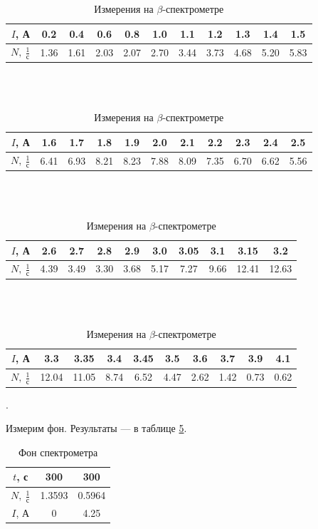 \documentclass[a4paper, 12pt]{article}
\newcounter{Points}
\newcommand{\point}{\arabic{Points}. \addtocounter{Points}{1}}
\begin{document}
\begin{table}[!h]
    \centering
    \begin{tabular}{|c|c|c|c|c|c|c|c|c|c|c|}
        \hline
        $I$, А & 0.2 & 0.4 & 0.6 & 0.8 & 1.0 & 1.1 & 1.2 & 1.3 & 1.4 & 1.5 \\ \hline
        $N, ~\frac{1}{с}$ & 1.36 & 1.61 & 2.03 & 2.07 & 2.70 & 3.44 & 3.73 & 4.68 & 5.20 & 5.83 \\ \hline
    \end{tabular}
    \\~\\
    \begin{tabular}{|c|c|c|c|c|c|c|c|c|c|c|}
        \hline
        $I$, А & 1.6 & 1.7 & 1.8 & 1.9 & 2.0 & 2.1 & 2.2 & 2.3 & 2.4 & 2.5 \\ \hline
        $N, ~\frac{1}{с}$ & 6.41 & 6.93 & 8.21 & 8.23 & 7.88 & 8.09 & 7.35 & 6.70 & 6.62 & 5.56 \\ \hline
    \end{tabular}
    \\~\\
    \begin{tabular}{|c|c|c|c|c|c|c|c|c|c|}
        \hline
        $I$, А & 2.6 & 2.7 & 2.8 & 2.9 & 3.0 & 3.05 & 3.1 & 3.15 & 3.2 \\ \hline
        $N, ~\frac{1}{с}$ & 4.39 & 3.49 & 3.30 & 3.68 & 5.17 & 7.27 & 9.66 & 12.41 & 12.63 \\ \hline
    \end{tabular}
    \\~\\
    \begin{tabular}{|c|c|c|c|c|c|c|c|c|c|}
        \hline
        $I$, А & 3.3 & 3.35 & 3.4 & 3.45 & 3.5 & 3.6 & 3.7 & 3.9 & 4.1 \\ \hline
        $N, ~\frac{1}{с}$ & 12.04 & 11.05 & 8.74 & 6.52 & 4.47 & 2.62 & 1.42 & 0.73 & 0.62 \\ \hline
    \end{tabular}
    \caption {Измерения на $\beta$-спектрометре}
    \label{tab:meas}
\end{table}

\point Измерим фон. Результаты --- в таблице \ref{tab:back}.

\begin{table}[!h]
    \centering
    \begin{tabular}{|c|c|c|}
        \hline
        $t$, с & 300 & 300\\ \hline
        $N, ~\frac{1}{с}$ & 1.3593 & 0.5964\\ \hline
        $I$, А & 0 & 4.25 \\ \hline
    \end{tabular}
    \caption {Фон спектрометра}
    \label{tab:back}
\end{table}
\end{document}
